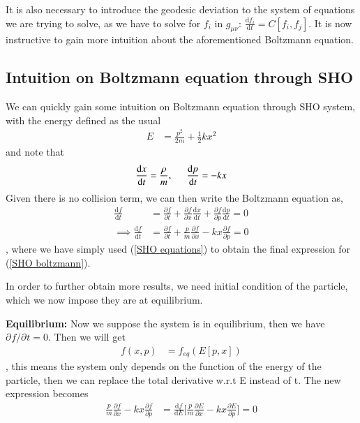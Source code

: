 \documentclass[a4paper, 12pt]{article}
\begin{document}
{{  It is also necessary to introduce the geodesic deviation to the system of
  equations we are trying to solve, as we have to solve for \( f_i \) in
  \( g_{\mu \nu} \): \( \frac{\mathrm{d}f_i}{\mathrm{d}t} = C[f_i,
  f_j]. 
  \) It is now instructive to gain more intuition about the
  aforementioned Boltzmann equation. 

  \subsection{Intuition on Boltzmann equation through SHO}%
    \label{sub:Intuition on Boltzmann equation through SHO}
  We can quickly gain some intuition on Boltzmann equation through
  SHO system, with the energy defined as the usual 
  \begin{align}
    \label{SHO energy}
    E &= \frac{p^2}{2m} + \frac{1}{2} k x^{2}   
  \end{align}
  and note that 
  \begin{align}
    \label{SHO equations}
    \frac{\mathrm{d}x}{\mathrm{d}t} = \frac{\rho}{m}, \hspace{0.5cm}
    \frac{\mathrm{d}p}{\mathrm{d}t} = -kx
  \end{align}
  Given there is no collision term, we can then write the Boltzmann
  equation as, 
  \begin{align}
    \label{SHO boltzmann}
    \frac{\mathrm{d}f}{\mathrm{d}t} &= \frac{\partial f}{\partial t} +
    \frac{\partial f}{\partial x} \frac{\mathrm{d}x}{\mathrm{d}t}
    + \frac{\partial f}{\partial p}
    \frac{\mathrm{d}p}{\mathrm{d}t} = 0 \\ 
    \implies \frac{\mathrm{d}f}{\mathrm{d}t} &=  \frac{\partial
    f}{\partial t} + \frac{p}{m} \frac{\partial f}{\partial x}  - k
    x \frac{\partial f}{\partial p} = 0 
  \end{align}, where we have simply used (\ref{SHO equations}) to obtain
  the final expression for (\ref{SHO boltzmann}).
  
  In order to further obtain more results, we need initial condition
  of the particle, which we now impose they are at equilibrium. 

  \textbf{Equilibrium: } Now we suppose the system is in
  equilibrium, then we have \( \partial_{}^{} f / \partial_{}^{}t = 0
  \). Then we will get 
  \begin{align}
    \label{SHO equlibrium distribution}
    f(x, p) &= f_{eq}(E[p, x]) 
  \end{align}, this means the system only depends on the function of
  the energy of the particle, then we can replace the total derivative
  w.r.t E instead of t. The new expression becomes 
  \begin{align}
    \label{new expression for SHO}
    \frac{p}{m}\frac{\partial f}{\partial x}  - k x \frac{\partial
    f}{\partial p} &= \frac{\mathrm{d}f}{\mathrm{d}E} \bigg[
    \frac{p}{m} \frac{\partial E}{\partial x} - k x \frac{\partial
    E}{\partial p}  \bigg]   = 0 
  \end{align}
  
}}
\end{document}
